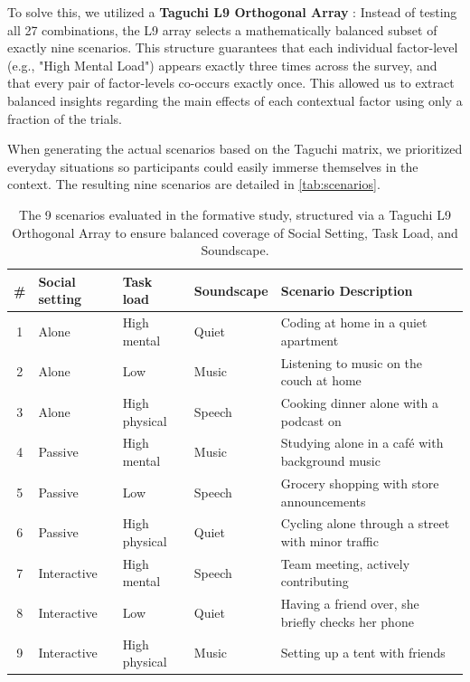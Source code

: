 To solve this, we utilized a \textbf{Taguchi L9 Orthogonal Array} \cite{Roy_10_Taguchi1}: Instead of testing all 27 combinations, the L9 array selects a mathematically balanced subset of exactly nine scenarios. This structure guarantees that each individual factor-level (e.g., "High Mental Load") appears exactly three times across the survey, and that every pair of factor-levels co-occurs exactly once. This allowed us to extract balanced insights regarding the main effects of each contextual factor using only a fraction of the trials. 

When generating the actual scenarios based on the Taguchi matrix, we prioritized everyday situations so participants could easily immerse themselves in the context. The resulting nine scenarios are detailed in \autoref{tab:scenarios}.

\begin{table}[H]
\centering
\caption{The 9 scenarios evaluated in the formative study, structured via a Taguchi L9 Orthogonal Array to ensure balanced coverage of Social Setting, Task Load, and Soundscape.}
\label{tab:scenarios}
\begin{tabular}{@{}clllp{7.5cm}@{}}
\toprule
\textbf{\#} & \textbf{Social setting} & \textbf{Task load} & \textbf{Soundscape} & \textbf{Scenario Description} \\
\midrule
1 & Alone       & High mental   & Quiet  & Coding at home in a quiet apartment \\
2 & Alone       & Low           & Music  & Listening to music on the couch at home \\
3 & Alone       & High physical & Speech & Cooking dinner alone with a podcast on \\
\midrule
4 & Passive     & High mental   & Music  & Studying alone in a café with background music \\
5 & Passive     & Low           & Speech & Grocery shopping with store announcements \\
6 & Passive     & High physical & Quiet  & Cycling alone through a street with minor traffic\\
\midrule
7 & Interactive & High mental   & Speech & Team meeting, actively contributing \\
8 & Interactive & Low           & Quiet  & Having a friend over, she briefly checks her phone \\
9 & Interactive & High physical & Music  & Setting up a tent with friends \\
\bottomrule
\end{tabular}
\end{table}

